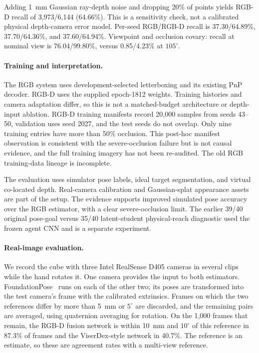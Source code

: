 Adding 1~mm Gaussian ray-depth noise and dropping 20\% of points yields RGB-D recall of 3,973/6,144 (64.66\%). This is a sensitivity check, not a calibrated physical depth-camera error model. Per-seed RGB/RGB-D recall is 37.30/64.89\%, 37.70/64.36\%, and 37.60/64.94\%. Viewpoint and occlusion covary: recall at nominal view is 76.04/99.80\%, versus 0.85/4.23\% at $105^\circ$.

\paragraph{Training and interpretation.}
The RGB system uses development-selected letterboxing and its existing PnP decoder. RGB-D uses the supplied epoch-1812 weights. Training histories and camera adaptation differ, so this is not a matched-budget architecture or depth-input ablation. RGB-D training manifests record 20,000 samples from seeds 43--50, validation uses seed 2027, and the test seeds do not overlap. Only nine training entries have more than 50\% occlusion. This post-hoc manifest observation is consistent with the severe-occlusion failure but is not causal evidence, and the full training imagery has not been re-audited. The old RGB training-data lineage is incomplete.

The evaluation uses simulator pose labels, ideal target segmentation, and virtual co-located depth. Real-camera calibration and Gaussian-splat appearance assets are part of the setup. The evidence supports improved simulated pose accuracy over the RGB estimator, with a clear severe-occlusion limit. The earlier 39/40 original pose-goal versus 35/40 latent-student physical-reach diagnostic used the frozen agent CNN and is a separate experiment.

\paragraph{Real-image evaluation.}
We record the cube with three Intel RealSense D405 cameras in several clips while the hand rotates it. One camera provides the input to both estimators. FoundationPose~\cite{wen2024foundationpose} runs on each of the other two; its poses are transformed into the test camera's frame with the calibrated extrinsics. Frames on which the two references differ by more than 5~mm or $5^\circ$ are discarded, and the remaining pairs are averaged, using quaternion averaging for rotation. On the 1,000 frames that remain, the RGB-D fusion network is within 10~mm and $10^\circ$ of this reference in 87.3\% of frames and the ViserDex-style network in 40.7\%. The reference is an estimate, so these are agreement rates with a multi-view reference.

